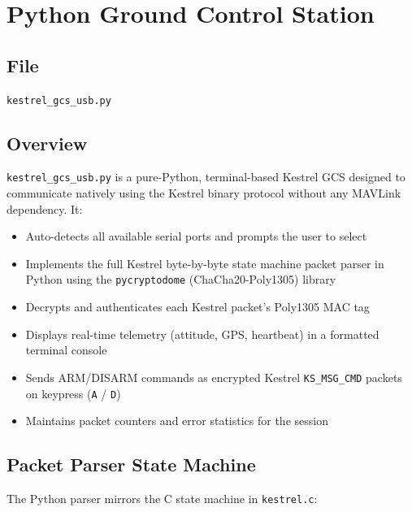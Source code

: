 \documentclass[11pt,a4paper]{article}
\begin{document}
\newpage

\section{Python Ground Control Station}
\label{sec:gcs}

\subsection{File}
\begin{center}
    \texttt{kestrel\_gcs\_usb.py}
\end{center}

\subsection{Overview}

\texttt{kestrel\_gcs\_usb.py} is a pure-Python, terminal-based Kestrel GCS
designed to communicate natively using the Kestrel binary protocol without
any MAVLink dependency. It:

\begin{itemize}[noitemsep]
    \item Auto-detects all available serial ports and prompts the user to select
    \item Implements the full Kestrel byte-by-byte state machine packet parser
          in Python using the \texttt{pycryptodome} (ChaCha20-Poly1305) library
    \item Decrypts and authenticates each Kestrel packet's Poly1305 MAC tag
    \item Displays real-time telemetry (attitude, GPS, heartbeat) in a formatted
          terminal console
    \item Sends ARM/DISARM commands as encrypted Kestrel \texttt{KS\_MSG\_CMD}
          packets on keypress (\texttt{A} / \texttt{D})
    \item Maintains packet counters and error statistics for the session
\end{itemize}

\subsection{Packet Parser State Machine}

The Python parser mirrors the C state machine in \texttt{kestrel.c}:
\end{document}
